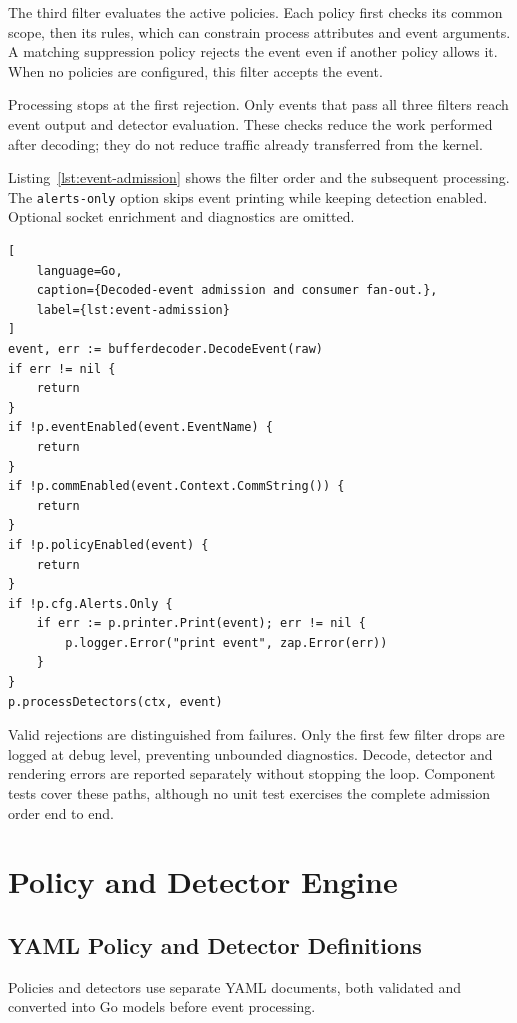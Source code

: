 The third filter evaluates the active policies. Each policy first checks
its common scope, then its rules, which can constrain process attributes
and event arguments. A matching suppression policy rejects the event even
if another policy allows it. When no policies are configured, this filter
accepts the event.

Processing stops at the first rejection. Only events that pass all three
filters reach event output and detector evaluation. These checks reduce
the work performed after decoding; they do not reduce traffic already
transferred from the kernel.

Listing~\ref{lst:event-admission} shows the filter order and the subsequent
processing. The \texttt{alerts-only} option skips event printing while
keeping detection enabled. Optional socket enrichment and diagnostics are
omitted.

\begin{lstlisting}[
    language=Go,
    caption={Decoded-event admission and consumer fan-out.},
    label={lst:event-admission}
]
event, err := bufferdecoder.DecodeEvent(raw)
if err != nil {
    return
}
if !p.eventEnabled(event.EventName) {
    return
}
if !p.commEnabled(event.Context.CommString()) {
    return
}
if !p.policyEnabled(event) {
    return
}
if !p.cfg.Alerts.Only {
    if err := p.printer.Print(event); err != nil {
        p.logger.Error("print event", zap.Error(err))
    }
}
p.processDetectors(ctx, event)
\end{lstlisting}

Valid rejections are distinguished from failures. Only the first few filter
drops are logged at debug level, preventing unbounded diagnostics. Decode,
detector and rendering errors are reported separately without stopping the
loop. Component tests cover these paths, although no unit test exercises the
complete admission order end to end.

\section{Policy and Detector Engine}
\label{sec:implementation-policy-detector}

\subsection{YAML Policy and Detector Definitions}
  \label{subsec:implementation-yaml-definitions}

Policies and detectors use separate YAML documents, both validated and
converted into Go models before event processing.

